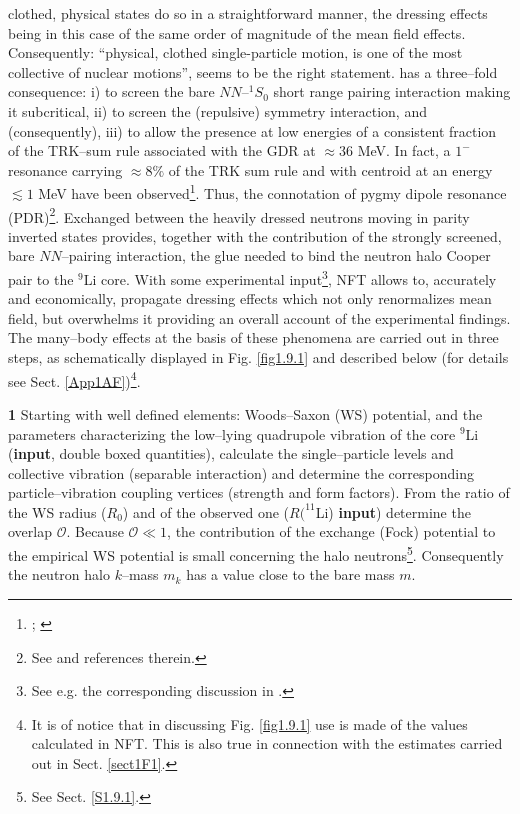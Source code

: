 { clothed, physical states do so in a straightforward manner, the dressing effects being in this case of the same order of magnitude of the mean field effects. Consequently: ``physical,  clothed single-particle motion, is 
 one of the most collective of nuclear  motions'', seems to be  the right statement.} has a three--fold consequence: i) to screen the bare $NN$--$^1S_0$ short  range pairing interaction making it subcritical, ii) to screen the (repulsive) symmetry interaction, and (consequently), iii) to allow the presence at low energies of a consistent fraction of the TRK--sum rule associated with the GDR at $\approx 36$ MeV. In fact, a $1^-$ resonance carrying $\approx 8\%$ of the TRK sum rule and with centroid at an energy $\lesssim 1$ MeV have been observed\footnote{\cite{Kanungo:15}; \cite{Sackett:93,Zinser:97}}. Thus, the connotation of pygmy dipole  resonance (PDR)\footnote{See \cite{Broglia:19} and references therein.}. Exchanged between the heavily dressed neutrons moving in  parity inverted states provides, together with the contribution of the strongly screened, bare $NN$--pairing interaction, the glue needed to bind the neutron halo Cooper pair to the $^9$Li core. With some experimental input\footnote{See e.g. the corresponding discussion in \cite{Barranco:17}.}, NFT allows to, accurately and economically, propagate dressing effects which not only renormalizes mean field, but overwhelms it providing an overall account of the experimental findings.
The many--body effects at the basis of these phenomena are carried out   in three steps, as schematically displayed in Fig. \ref{fig1.9.1} and described below (for details see Sect. \ref{App1AF})\footnote{It is of notice that in discussing Fig. \ref{fig1.9.1} use is made of the values calculated in NFT. This is also true in connection with the estimates carried out in Sect. \ref{sect1F1}.}.


\textbf{1} Starting with well defined elements: Woods--Saxon (WS) potential, and the parameters characterizing the low--lying quadrupole vibration of the core $^{9}$Li (\textbf{input}, double boxed quantities), calculate the single--particle levels and collective vibration (separable interaction) and determine the corresponding particle--vibration coupling vertices (strength and form factors). From the ratio of the WS radius ($R_0$) and of the observed one ($R(^{11}$Li) \textbf{input}) determine the overlap $\mathcal O$. Because $\mathcal O\ll 1$, the contribution of the exchange (Fock) potential to the empirical WS potential is small concerning the halo neutrons\footnote{See Sect. \ref{S1.9.1}.}. Consequently the neutron halo $k$--mass $m_k$ has a value close to the bare mass $m$.

